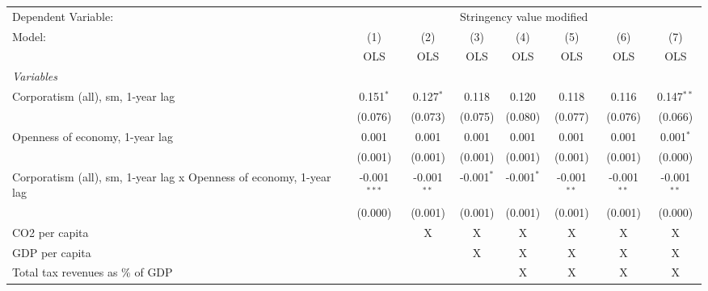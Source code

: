 
\begingroup
\centering
\begin{tabular}{lccccccc}
   \toprule
   Dependent Variable: & \multicolumn{7}{c}{Stringency value modified}\\
   Model:                                                              & (1)            & (2)           & (3)          & (4)          & (5)           & (6)           & (7)\\  
                                                                       &  OLS           & OLS           & OLS          & OLS          & OLS           & OLS           & OLS\\  
   \midrule
   \emph{Variables}\\
   Corporatism (all), sm, 1-year lag                                   & 0.151$^{*}$    & 0.127$^{*}$   & 0.118        & 0.120        & 0.118         & 0.116         & 0.147$^{**}$\\   
                                                                       & (0.076)        & (0.073)       & (0.075)      & (0.080)      & (0.077)       & (0.076)       & (0.066)\\   
   Openness of economy, 1-year lag                                     & 0.001          & 0.001         & 0.001        & 0.001        & 0.001         & 0.001         & 0.001$^{*}$\\   
                                                                       & (0.001)        & (0.001)       & (0.001)      & (0.001)      & (0.001)       & (0.001)       & (0.000)\\   
   Corporatism (all), sm, 1-year lag x Openness of economy, 1-year lag & -0.001$^{***}$ & -0.001$^{**}$ & -0.001$^{*}$ & -0.001$^{*}$ & -0.001$^{**}$ & -0.001$^{**}$ & -0.001$^{**}$\\   
                                                                       & (0.000)        & (0.001)       & (0.001)      & (0.001)      & (0.001)       & (0.001)       & (0.000)\\   
   CO2 per capita                                                      &                & X             & X            & X            & X             & X             & X\\  
   GDP per capita                                                      &                &               & X            & X            & X             & X             & X\\  
   Total tax revenues as \% of GDP                                     &                &               &              & X            & X             & X             & X\\  

\end{tabular}
